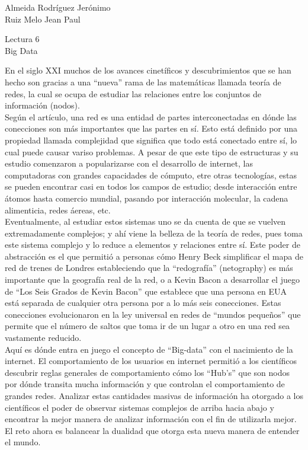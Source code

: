 \documentclass[a4paper, 12pt]{report}
\begin{document}
\begin{flushright}
    Almeida Rodríguez Jerónimo\\
    Ruiz Melo Jean Paul
\end{flushright}

\begin{center}
    {\LARGE Lectura 6}\\
    {\LARGE Big Data}
\end{center}

En el siglo XXI muchos de los avances cinetíficos y descubrimientos que se han
hecho son gracias a una ``nueva'' rama de las matemáticas llamada teoría de
redes, la cual se ocupa de estudiar las relaciones entre los conjuntos de
información (nodos).\\

Según el artículo, una red es una entidad de partes interconectadas en dónde las
conecciones son más importantes que las partes en sí. Esto está definido por una
propiedad llamada complejidad que significa que todo está conectado entre sí, lo
cual puede causar variso problemas. A pesar de que este tipo
de estructuras y su estudio comenzaron a popularizarse con el desarrollo de
internet, las computadoras con grandes capacidades de cómputo, etre otras
tecnologías, estas se pueden encontrar casi en todos los campos de estudio;
desde interacción entre átomos hasta comercio mundial, pasando por interacción
molecular, la cadena alimenticia, redes áereas, etc.\\

Eventualmente, al estudiar estos sistemas uno se da cuenta de que se vuelven
extremadamente complejos; y ahí viene la belleza de la teoría de redes, pues toma
este sistema complejo y lo reduce a elementos y relaciones entre sí. Este poder
de abstracción es el que permitió a personas cómo Henry Beck simplificar el mapa
de red de trenes de Londres estableciendo que la ``redografía'' (netography) es
más importante que la geografía real de la red, o a Kevin Bacon a desarrollar el
juego de ``Los Seis Grados de Kevin Bacon'' que establece que una persona en EUA
está separada de cualquier otra persona por a lo más seis conecciones. Estas
conecciones evolucionaron en la ley universal en redes de ``mundos pequeños''
que permite que el número de saltos que toma ir de un lugar a otro en una red
sea vastamente reducido.\\

Aquí es dónde entra en juego el concepto de ``Big-data'' con el nacimiento de la
internet. El comportamiento de los usuarios en internet permitió a los
científicos descubrir reglas generales de comportamiento cómo los ``Hub's'' que
son nodos por dónde transita mucha información y que controlan el comportamiento
de grandes redes. Analizar estas cantidades
masivas de información ha otorgado a los científicos el poder de observar
sistemas complejos de arriba hacia abajo y encontrar la mejor manera de analizar
información con el fin de utilizarla mejor. El reto ahora es balancear la
dualidad que otorga esta nueva manera de entender el mundo.
\end{document}
